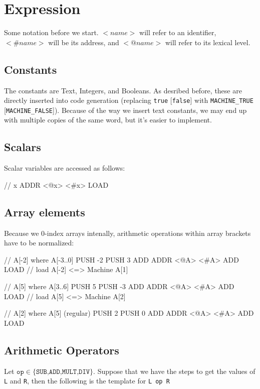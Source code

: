 \section{Expression}

Some notation before we start. $<name>$ will refer to an identifier,
$<\#name>$ will be its address, and $<@name>$ will refer to its lexical level.
\subsection{Constants}
The constants are Text, Integers, and Booleans. As desribed before, these are
directly inserted into code generation (replacing \texttt{true} [\texttt{false}]
with \texttt{MACHINE\_TRUE} [\texttt{MACHINE\_FALSE}]).
Because of the way we insert text constants, we may end up with multiple copies
of the same word, but it's easier to implement.

\subsection{Scalars}
Scalar variables are accessed as follows:

\begin{code}
// x
ADDR <@x> <#x>
LOAD
\end{code}

\subsection{Array elements}
Because we 0-index arrays intenally, arithmetic operations within array brackets
have to be normalized:

\begin{code}
// A[-2] where A[-3..0]
PUSH -2
PUSH 3
ADD
ADDR <@A> <#A>
ADD
LOAD // load A[-2] <=> Machine A[1]

// A[5] where A[3..6]
PUSH 5
PUSH -3
ADD
ADDR <@A> <#A>
ADD
LOAD // load A[5] <=> Machine A[2]

// A[2]  where A[5] (regular)
PUSH 2
PUSH 0
ADD
ADDR <@A> <#A>
ADD
LOAD
\end{code}

\subsection{Arithmetic Operators}
Let $\texttt{op} \in \{\texttt{SUB,ADD,MULT,DIV}\}$. Suppose that we have the
steps to get the values of \texttt{L} and \texttt{R}, then the following is the
template for \texttt{L op R}

